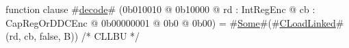 function clause #\hyperref[zdecode]{decode}# (0b010010 @ 0b10000 @ rd : IntRegEnc @ cb : CapRegOrDDCEnc @ 0b00000001 @ 0b0 @ 0b00) = #\hyperref[zSome]{Some}#(#\hyperref[zCLoadLinked]{CLoadLinked}#(rd, cb, false, B)) /* CLLBU */
